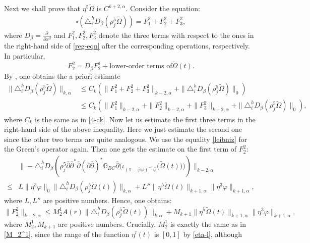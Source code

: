 \documentclass[12pt]{amsart}
\numberwithin{equation}{section}
\renewcommand{\1}{\mathds{1}}
\newcommand{\G}{\mathbb{G}}
\newcommand{\db}{\overline{\partial}}
\renewcommand{\>}{\rightarrow}
\newcommand{\p}{\partial}
\def\p{\partial}
\def\b{\bar}
\begin{document}
Next we shall prove that $\eta^5\tilde{\Omega}$ is $C^{k+2,\alpha}$.
Consider the equation:
\begin{align*}
\square(\triangle^h_i D_\beta(\rho_j^5\tilde{\Omega}))
 =F_1^2+F_2^2+F_3^2,
\end{align*}
where $D_\beta=\frac{\p\ }{\p x^\beta}$ and $F_1^2,F_2^2,F_3^2$
denote the three terms with respect to the ones in the right-hand
side of \eqref{reg-eqn} after the corresponding operations,
respectively.  In particular,
$$F_2^2=D_\beta F_2^1+\text{lower-order terms of
$\tilde{\Omega}(t)$}.$$  By \cite[Appendix.Theorem 2.3]{k}, one
obtains the a priori estimate
\begin{equation}\label{dq-3f}
\begin{aligned}
\|\triangle^h_iD_\beta(\rho_j^5\tilde{\Omega})\|_{k, \alpha}
 &\leq C_k(\|
F_1^2+F_2^2+F_3^2 \|_{k-2,
\alpha}+\|\triangle^h_iD_\beta(\rho_j^5\tilde{\Omega})\|_{0})\\
 &\leq C_k(\|
F_1^2\|_{k-2, \alpha}+\| F_2^2\|_{k-2, \alpha}+\| F_3^2 \|_{k-2,
\alpha}+\|\triangle^h_iD_\beta(\rho_j^5\tilde{\Omega})\|_{0}),
\end{aligned}
\end{equation}
where $C_k$ is the same as in \eqref{4-ck}. Now let us estimate the
first three terms in the right-hand side of the above inequality.
Here we just estimate the second one since the other two terms are
quite analogous. We use the equality \eqref{leibniz} for the Green's
operator again. Then one gets the estimate on the first term of
$F_2^2$: $$\label{}
\begin{aligned}
   &\| -\triangle^h_iD_\beta\left(\rho_j^5\db \db^*\db(\p\db)^* \G_{BC} \db \Big(
\iota_{(\1-\b{\varphi}\varphi)^{-1}\b{\varphi}} \big(
\tilde{\Omega}(t) \big) \Big)\right)\|_{k-2, \alpha}\\
 \leq& L\|\eta^3\varphi \|_{0}\|\triangle^h_iD_\beta(\rho_j^5\tilde{\Omega}(t))\|_{k, \alpha}
 +L''\|\eta^5\tilde{\Omega}(t)\|_{k+1, \alpha}\|\eta^3\varphi\|_{k+1,
 \alpha},
\end{aligned}
$$
where $L,L''$ are positive numbers. Hence, one obtains:
\begin{equation}\label{F22}
\| F_2^2\|_{k-2, \alpha}\leq
M_2^1A(r)\|\triangle^h_iD_\beta(\rho_j^5\tilde{\Omega}(t))\|_{k,
\alpha} +M_{k+1}\|\eta^5\tilde{\Omega}(t)\|_{k+1,
\alpha}\|\eta^3\varphi\|_{k+1,
 \alpha},
\end{equation}
where $M_2^1,M_{k+1}$ are positive numbers. Crucially, $M_2^1$ is
exactly the same as in \eqref{M_2^1}, since the range of the
function $\eta^l(t)$ is $[0,1]$ by \eqref{eta-l}, although
\end{document}
